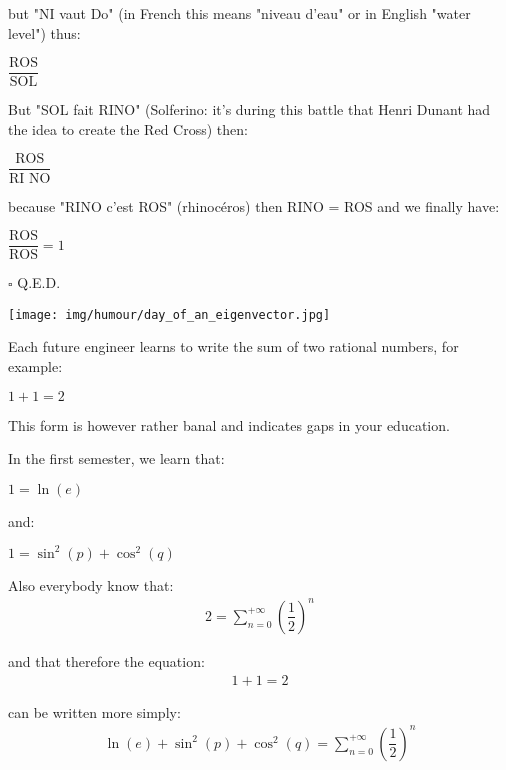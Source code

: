 	but "NI vaut Do" (in French this means "niveau d'eau" or in English "water level") thus:
	\begin{center}
	$\dfrac{\text{ROS}}{\text{SOL}}$  
	\end{center}
	
	But "SOL fait RINO" (Solferino: it's during this battle that Henri Dunant had the idea to create the Red Cross) then: 
	\begin{center}
	$\dfrac{\text{ROS}}{\text{RI NO}}$  
	\end{center}
	
	because "RINO c'est ROS" (rhinocéros) then RINO = ROS and we finally have: 
	\begin{center}
	$\dfrac{\text{ROS}}{\text{ROS}}=1$  
	\end{center}

	\begin{flushright}
		$\square$  Q.E.D.
	\end{flushright}	

	\begin{center}\underline{\hspace{5 cm}}\end{center}
	\begin{center}
		\texttt{[image: img/humour/day\_of\_an\_eigenvector.jpg]}	
	\end{center}
	Each future engineer learns to write the sum of two rational numbers, for example:
	\begin{center}
	$1+1=2$  
	\end{center}
	
	This form is however rather banal and indicates gaps in your education.
	
	In the first semester, we learn that:
	\begin{center}
	$1=\ln(e)$  
	\end{center}
	
	and:
	\begin{center}
	$1=\sin^2(p)+\cos^2(q)$  
	\end{center}
	
	Also everybody know that:
	\begin{gather*}
	2=\sum_{n=0}^{+\infty} \left( \dfrac{1}{2} \right)^n
	\end{gather*}
	
	and that therefore the equation:
	\begin{gather*}
	1+1=2
	\end{gather*}
	
	can be written more simply:
	\begin{gather*}
	\ln(e)+\sin^2(p)+\cos^2(q)=\sum_{n=0}^{+\infty} \left( \dfrac{1}{2} \right)^n
	\end{gather*}
	
